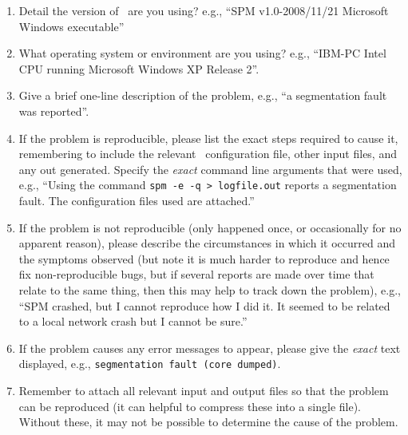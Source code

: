 \begin{enumerate}
\item Detail the version of \SPM\ are you using? e.g., ``SPM v1.0-2008/11/21 Microsoft Windows executable''

\item What operating system or environment are you using? e.g., ``IBM-PC Intel CPU running Microsoft Windows XP Release 2''.

\item Give a brief one-line description of the problem, e.g., ``a segmentation fault was reported''.

\item If the problem is reproducible, please list the exact steps required to cause it, remembering to include the relevant \SPM\ configuration file, other input files, and any out generated. Specify the \emph{exact} command line arguments that were used, e.g., ``Using the command \texttt{spm -e -q > logfile.out} reports a segmentation fault. The configuration files used are attached.''

\item If the problem is not reproducible (only happened once, or occasionally for no apparent reason), please describe the circumstances in which it occurred and the symptoms observed (but note it is much harder to reproduce and hence fix non-reproducible bugs, but if several reports are made over time that relate to the same thing, then this may help to track down the problem), e.g., ``SPM crashed, but I cannot reproduce how I did it. It seemed to be related to a local network crash but I cannot be sure.''

\item If the problem causes any error messages to appear, please give the \emph{exact} text displayed, e.g., \texttt{segmentation fault (core dumped)}.

\item Remember to attach all relevant input and output files so that the problem can be reproduced (it can helpful to compress these into a single file). Without these, it may not be possible to determine the cause of the problem.

\end{enumerate}

